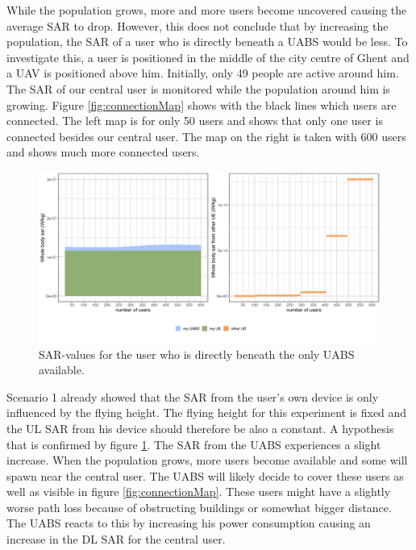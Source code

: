 While the population grows, more and more users become uncovered causing the average SAR to drop. 
However, this does not conclude that  by increasing the population, the SAR of a user who is directly beneath a \gls{UABS} would be less.
To investigate this, a user is positioned in the middle of the city centre of Ghent and a \gls{UAV} is positioned above him. Initially, only 
49 people are active around him. The \gls{SAR} of our central user is monitored while the population around him is growing.
Figure \ref{fig:connectionMap} shows with the black lines which users are connected. The left map is for only 50 users and 
shows that only one user is connected besides our central user. The map on the right is taken with 600 users and shows much more connected users.

\begin{figure}[h!]
\centering
  \includegraphics[width=\textwidth/6*5]{../results/s2/uvsulsarcentralUser.png}
  \caption{SAR-values for the user who is directly beneath the only UABS available.}
  \label{fig:uvsulsarcentralUsers}
\end{figure}

Scenario 1 already showed that the \gls{SAR} from the user's own device is only influenced by the flying height. 
The flying height for this experiment is fixed and the \gls{UL} \gls{SAR} from his device should therefore be also a constant. 
A hypothesis that is confirmed by figure \ref{fig:uvsulsarcentralUsers}.
The \gls{SAR} from the \gls{UABS} experiences a slight increase. When the population grows, more users become available 
and some will spawn near the central user. The \gls{UABS} will likely decide to cover these users as well as visible in figure \ref{fig:connectionMap}.
These users might have a slightly 
worse path loss because of obstructing buildings or somewhat bigger distance. The \gls{UABS} reacts to this by increasing 
his power consumption causing an increase in the \gls{DL} \gls{SAR} for the central user.


